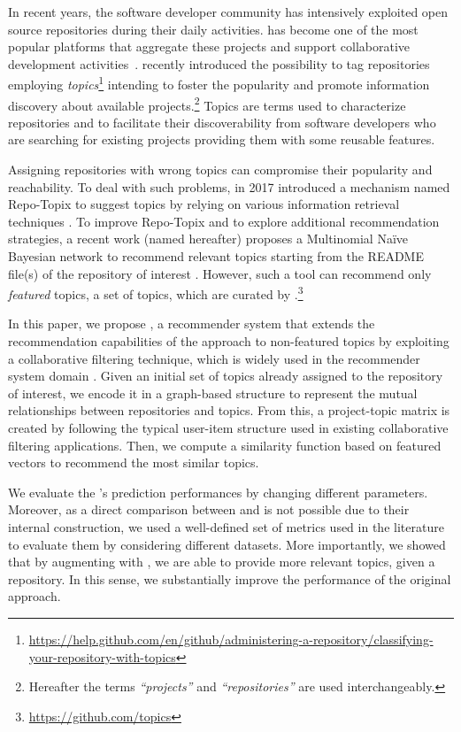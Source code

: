 In recent years, the software developer community has intensively exploited open source 
repositories during their daily activities. \GH has become one of the most
popular platforms that aggregate these projects and support collaborative 
development activities~\cite{7832894}. \GH recently introduced the possibility 
to tag repositories employing 
\emph{topics}\footnote{\url{https://help.github.com/en/github/administering-a-repository/classifying-your-repository-with-topics}}
 intending to foster the popularity and promote information discovery about 
available projects.\footnote{Hereafter the terms \GH  \emph{``projects''} and \emph{``repositories''} 
are used 
interchangeably.} Topics are terms used to characterize repositories and to 
facilitate their discoverability from software developers who are searching 
for existing projects providing them with some reusable features. 

Assigning repositories with wrong topics can compromise their popularity and 
reachability. To deal with such problems, in 2017 \GH introduced a 
mechanism named Repo-Topix to suggest topics by relying on various information 
retrieval techniques \cite{repo-topix}. To improve Repo-Topix 
and to explore additional recommendation strategies, a recent work (named \MNB 
hereafter) proposes a Multinomial Na\"ive Bayesian network to 
recommend relevant topics starting from the README file(s) of the repository of 
interest \cite{10.1145/3383219.3383227}. However, such a tool can recommend 
only \emph{featured} topics, \ie a set of topics, which are curated by 
\GH.\footnote{\url{https://github.com/topics}}


In this paper, we propose \TF, a recommender system that extends the 
recommendation capabilities of the \MNB approach to 
non-featured topics by exploiting a collaborative filtering technique, which is 
widely used in the recommender system domain 
\cite{Schafer:2007:CFR:1768197.1768208}. Given an initial set of topics already 
assigned to the \GH repository of interest, we encode it in a graph-based 
structure to represent the mutual relationships between repositories and 
topics. From this, a project-topic matrix is created by following the 
typical user-item structure used in existing collaborative filtering 
applications. Then, we compute a similarity function based on featured vectors 
to recommend the most similar topics.

We evaluate the \TF's prediction performances by changing different parameters. 
Moreover, as a direct comparison between \TF and \MNB is not
possible due to their internal construction, we used a well-defined set of 
metrics used in the literature to evaluate them by 
considering different datasets. More importantly, we showed that by augmenting \MNB with \TF, we are able to provide more relevant topics, given a repository. In this sense, we substantially improve the performance of the original \MNB approach.

